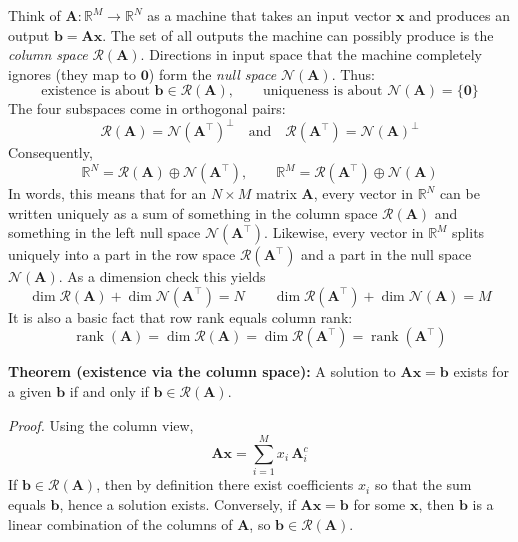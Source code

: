 Think of $\mathbf{A}:\mathbb{R}^M\to\mathbb{R}^N$ as a machine that takes an input vector $\mathbf{x}$ and produces an output $\mathbf{b}=\mathbf{A}\mathbf{x}$. The set of all outputs the machine can possibly produce is the \emph{column space} $\mathcal{R}(\mathbf{A})$. Directions in input space that the machine completely ignores (they map to $\mathbf{0}$) form the \emph{null space} $\mathcal{N}(\mathbf{A})$. Thus:
\[
\text{existence is about }\mathbf{b}\in\mathcal{R}(\mathbf{A}),\qquad
\text{uniqueness is about }\mathcal{N}(\mathbf{A})=\{\mathbf{0}\}
\]
The four subspaces come in orthogonal pairs:
\[
\mathcal{R}(\mathbf{A})=\mathcal{N}(\mathbf{A}^{\top})^{\perp}
\quad\text{and}\quad
\mathcal{R}(\mathbf{A}^{\top})=\mathcal{N}(\mathbf{A})^{\perp}
\]
Consequently,
\[
\mathbb{R}^N=\mathcal{R}(\mathbf{A})\oplus \mathcal{N}(\mathbf{A}^{\top}),
\qquad
\mathbb{R}^M=\mathcal{R}(\mathbf{A}^{\top})\oplus \mathcal{N}(\mathbf{A})
\]
In words, this means that for an $N\times M$ matrix $\mathbf{A}$, every vector in $\mathbb{R}^N$ can be written uniquely as a sum of something in the column space $\mathcal R(\mathbf{A})$ and something in the left null space $\mathcal N(\mathbf{A}^\top)$. Likewise, every vector in $\mathbb{R}^M$ splits uniquely into a part in the row space $\mathcal R(\mathbf{A}^\top)$ and a part in the null space $\mathcal N(\mathbf{A})$. As a dimension check this yields
\[
\dim\mathcal{R}(\mathbf{A})+\dim\mathcal{N}(\mathbf{A}^{\top})=N
\qquad
\dim\mathcal{R}(\mathbf{A}^{\top})+\dim\mathcal{N}(\mathbf{A})=M
\]
It is also a basic fact that row rank equals column rank:
\[
\operatorname{rank}(\mathbf{A})=\dim\mathcal{R}(\mathbf{A})
=\dim\mathcal{R}(\mathbf{A}^{\top})
=\operatorname{rank}(\mathbf{A}^{\top})
\]

\begin{theoremBox}
\textbf{Theorem (existence via the column space):} A solution to $\mathbf{A}\mathbf{x}=\mathbf{b}$ exists for a given $\mathbf{b}$ if and only if $\mathbf{b}\in\mathcal{R}(\mathbf{A})$.

\textit{Proof.}\; Using the column view,
\[
\mathbf{A}\mathbf{x}=\sum_{i=1}^{M}x_i\,\mathbf{A}_i^c
\]
If $\mathbf{b}\in\mathcal{R}(\mathbf{A})$, then by definition there exist coefficients $x_i$ so that the sum equals $\mathbf{b}$, hence a solution exists. Conversely, if $\mathbf{A}\mathbf{x}=\mathbf{b}$ for some $\mathbf{x}$, then $\mathbf{b}$ is a linear combination of the columns of $\mathbf{A}$, so $\mathbf{b}\in\mathcal{R}(\mathbf{A})$.

\end{theoremBox}

